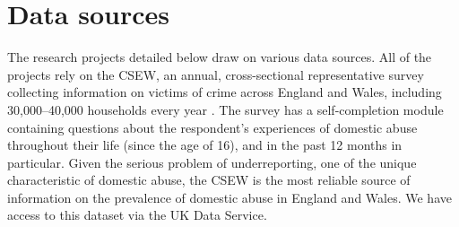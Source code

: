 \documentclass[11pt, a4paper]{article}
\begin{document}




\section{Data sources}

The research projects detailed below draw on various data sources. All of the projects rely on the CSEW, an annual, cross-sectional representative survey collecting information on victims of crime across England and Wales, including 30,000--40,000 households every year \cite{OfficeforNationalStatistics2019}. The survey has a self-completion module containing questions about the respondent's experiences of domestic abuse throughout their life (since the age of 16), and in the past 12 months in particular. Given the serious problem of underreporting, one of the unique characteristic of domestic abuse, the CSEW is the most reliable source of information on the prevalence of domestic abuse in England and Wales. We have access to this dataset via the UK Data Service.
\end{document}
